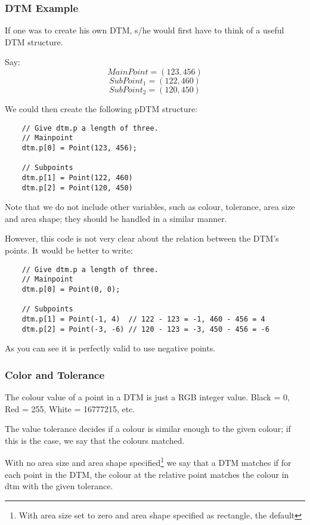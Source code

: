 \documentclass[a4paper, 10pt]{report} %
\begin{document}
\subsubsection{DTM Example}

If one was to create his own DTM, s/he would first have to
think of a useful DTM structure.

Say:
$$ MainPoint = (123, 456)  $$
$$ SubPoint_1 = (122, 460) $$
$$ SubPoint_2 = (120, 450) $$

We could then create the following pDTM structure:

\begin{verbatim}
	// Give dtm.p a length of three.
	// Mainpoint
	dtm.p[0] = Point(123, 456);

	// Subpoints
	dtm.p[1] = Point(122, 460)
	dtm.p[2] = Point(120, 450)
\end{verbatim}

Note that we do not include other variables, such as colour, tolerance, area
size and area shape; they should be handled in a similar manner.

However, this code is not very clear about the relation between the DTM's
 points. It would be better to write:

\begin{verbatim}
    // Give dtm.p a length of three.
    // Mainpoint
    dtm.p[0] = Point(0, 0);

    // Subpoints
    dtm.p[1] = Point(-1, 4)  // 122 - 123 = -1, 460 - 456 = 4
    dtm.p[2] = Point(-3, -6) // 120 - 123 = -3, 450 - 456 = -6
\end{verbatim}

As you can see it is perfectly valid to use negative points.

\subsubsection{Color and Tolerance}

The colour value of a point in a DTM is just a RGB integer value.
Black = 0, Red = 255, White = 16777215, etc.

The value tolerance decides if a colour is similar enough to the given
colour; if this is the case, we say that the colours matched.

With no area size and area shape specified\footnote{With area size set to zero
 and area shape specified as rectangle, the default} we say that a DTM matches if
for each point in the DTM, the colour at the relative point matches the colour
 in dtm with the given tolerance.
\end{document}
